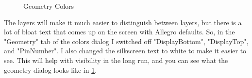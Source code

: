 \begin{figure}[H]
  \centering
\caption{Geometry Colors}
\label{img:geometryColors}
\end{figure}

The layers will make it much easier to distinguish between layers, but there is a lot of bloat text that comes up on the screen with 
Allegro defaults. So, in the "Geometry" tab of the colors dialog I switched off "DisplayBottom", "DisplayTop", and "PinNumber". I also changed
the silkscreen text to white to make it easier to see. This will help with visibility in the long run, and you can see what the geometry
dialog looks like in \ref{img:geometryColors}.

